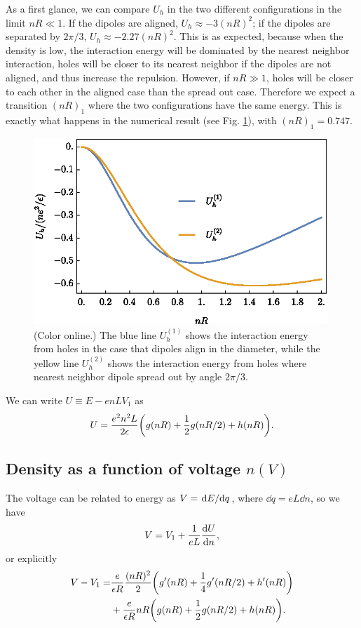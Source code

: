 \documentclass[10pt]{article}
\begin{document}
As a first glance, we can compare $U_h$ in the two different configurations in the limit $nR \ll 1$. If the dipoles are aligned, $U_h \approx -3 (nR)^2$; if the dipoles are separated by $2\pi/3$, $U_h \approx -2.27 (nR)^2$. This is as expected, because when the density is low, the interaction energy will be dominated by the nearest neighbor interaction, holes will be closer to its nearest neighbor if the dipoles are not aligned, and thus increase the repulsion. However, if $nR \gg 1$, holes will be closer to each other in the aligned case than the spread out case. Therefore we expect a transition $(nR)_1$ where the two configurations have the same energy. This is exactly what happens in the numerical result (see Fig. \ref{fig: 2}), with $(nR)_1 = 0.747$.

\begin{figure}[H]
	\centering
	\includegraphics[height=7cm]{hole_energy.eps}
	\caption{(Color online.) The blue line $U_h^{(1)}$ shows the interaction energy from holes in the case that dipoles align in the diameter, while the yellow line $U_h^{(2)}$ shows the interaction energy from holes where nearest neighbor dipole spread out by angle $2\pi/3$.}
	\label{fig: 2}
\end{figure}

We can write $U \equiv E - enLV_1$ as
\begin{equation}
	U = \frac{e^2n^2L}{2\epsilon} \qty(g(nR) + \frac{1}{2} g(nR/2) + h(nR)).
\end{equation}



\subsection{Density as a function of voltage $n(V)$}

The voltage can be related to energy as $V = \dv*{E}{q}$, where $\dd{q} = eL \dd{n}$, so we have
\begin{equation}
	V = V_1 + \frac{1}{eL} \dv{U}{n},
\end{equation}
or explicitly
\begin{align*}
	V-V_1 =& \frac{e}{\epsilon R} \frac{(nR)^2}{2} \qty(g'(nR) + \frac{1}{4} g'(nR/2) + h'(nR)) \\
	&+ \frac{e}{\epsilon R} nR \qty(g(nR) + \frac{1}{2} g(nR/2) + h(nR)).
\end{align*}
\end{document}
